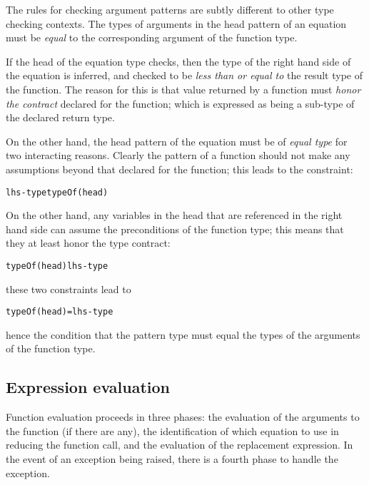 The rules for checking argument patterns are subtly different to other type checking contexts. The types of arguments in the head pattern of an equation must be \emph{equal} to the corresponding argument of the function type.

If the head of the equation type checks, then the type of the right hand side of the equation is inferred, and checked to be \emph{less than or equal to} the result type of the function. The reason for this is that value returned by a function must \emph{honor the contract} declared for the function; which is expressed as being a sub-type of the declared return type. 

On the other hand, the head pattern of the equation must be of \emph{equal type} for two interacting reasons. Clearly the pattern of a function should not make any assumptions beyond that declared for the function; this leads to the constraint:
\begin{alltt}
lhs-type \typearrow typeOf(head)
\end{alltt}
On the other hand, any variables in the head that are referenced in the right hand side can assume the preconditions of the function type; this means that they at least honor the type contract:
\begin{alltt}
typeOf(head) \typearrow lhs-type
\end{alltt}
these two constraints lead to
\begin{alltt}
typeOf(head) = lhs-type
\end{alltt}
hence the condition that the pattern type must equal the types of the arguments of the function type.

\subsection{Expression evaluation}
Function evaluation proceeds in three phases: the evaluation of the arguments to the function (if there are any), the identification of which equation to use in reducing the function call, and the evaluation of the replacement expression. In the event of an exception being raised, there is a fourth phase to handle the exception.

